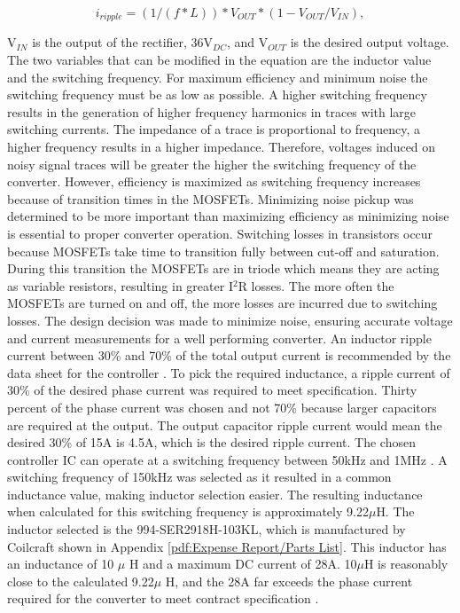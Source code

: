 \documentclass[11pt]{article}
\begin{document}
    \begin{equation}
        i_{ripple}=(1/(f*L))*V_{OUT}*(1-V_{OUT}/V_{IN}),
        \label{inductrip}
    \end{equation}
   
    \noindent V$_{IN}$ is the output of the rectifier, 36V$_{DC}$, and V$_{OUT}$ is the desired output voltage. The two variables that can be modified in the equation are the inductor value and the switching frequency. For maximum efficiency and minimum noise the switching frequency must be as low as possible. A higher switching frequency results in the generation of higher frequency harmonics in traces with large switching currents. The impedance of a trace is proportional to frequency, a higher frequency results in a higher impedance. Therefore, voltages induced on noisy signal traces will be greater the higher the switching frequency of the converter. However, efficiency is maximized as switching frequency increases because of transition times in the MOSFETs. Minimizing noise pickup was determined to be more important than maximizing efficiency as minimizing noise is essential to proper converter operation. Switching losses in transistors occur because MOSFETs take time to transition fully between cut-off and saturation. During this transition the MOSFETs are in triode which means they are acting as variable resistors, resulting in greater I$^2$R losses. The more often the MOSFETs are turned on and off, the more losses are incurred due to switching losses. The design decision was made to minimize noise, ensuring accurate voltage and current measurements for a well performing converter.
    \newline
    \newline
    \noindent An inductor ripple current between 30\% and 70\% of the total output current is recommended by the data sheet for the controller \cite{linear_technology_ltc3892:_nodate}. To pick the required inductance, a ripple current of 30\%  of the desired phase current was required to meet specification. Thirty percent of the phase current was chosen and not 70\% because larger capacitors are required at the output. The output capacitor ripple current would mean the desired 30\% of 15A is 4.5A, which is the desired ripple current. The chosen controller IC can operate at a switching frequency between 50kHz and 1MHz \cite{linear_technology_ltc3892:_nodate}. A switching frequency of 150kHz was selected as it resulted in a common inductance value, making inductor selection easier. The resulting inductance when calculated for this switching frequency is approximately 9.22$\mu$H. The inductor selected is the 994-SER2918H-103KL, which is manufactured by Coilcraft shown in Appendix \ref{pdf:Expense Report/Parts List}. This inductor has an inductance of 10 $\mu$ H and a maximum DC current of 28A. 10$\mu$H is reasonably close to the calculated 9.22$\mu$ H, and the 28A far exceeds the phase current required for the converter to meet contract specification \cite{noauthor_shielded_2017}.
\end{document}
